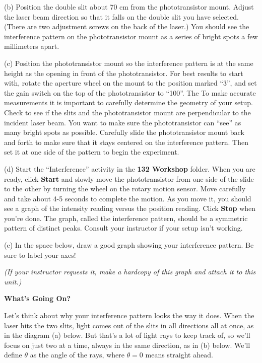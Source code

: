 (b) Position the double slit about 70 cm from the phototransistor mount. Adjust 
the laser beam direction so that it falls on the double slit you have selected. 
(There are two adjustment screws on the back of the laser.) 
You should see the interference pattern on the phototransistor mount as a series of bright spots a few millimeters apart. 

(c) Position the phototransistor mount so the interference pattern
is at the same height as the opening in front of the phototransistor. For best results to start with, rotate the aperture wheel on the mount to the position marked ``3'', and set the gain switch on the top of the phototransistor to ``100''. The To make accurate measurements it is important to carefully determine the geometry of your setup. Check to see if the slits and the phototransistor mount are perpendicular to the incident
laser beam.  You want to make sure the phototransistor can ``see'' as many
bright spots as possible. Carefully slide the phototransistor mount back and forth to make sure that it stays centered on the interference pattern. Then set it 
at one side of the pattern to begin the experiment.

(d) Start the ``Interference'' activity in the {\bf 132 Workshop} folder. 
When you are ready, click {\bf Start} and slowly move the phototransistor 
from one side of the slide to the other by turning the wheel on the rotary 
motion sensor. Move carefully and take about 4-5 seconds to complete the 
motion. 
As you move it, you should see a graph of the intensity reading versus the position reading. 
Click {\bf Stop} when you're done. 
The graph, called the interference pattern, should be a symmetric pattern of distinct peaks. Consult your instructor if your setup isn't working.

\pagebreak[2]
(e) In the space below, draw a good graph showing your interference pattern.  
Be sure to label your axes!
\answerspace{1.5in}

\textit{(If your instructor requests it, make a hardcopy of this graph and attach it to this unit.)}

\textbf{What's Going On?}

Let's think about why your interference pattern looks the way it does.  When the laser hits the two slits, 
light comes out of the slits in all directions all at once, as in the diagram (a) below.  
But that's a lot of light rays to keep track of, so we'll focus on just two at a time, always in the same direction, as in (b) below.
We'll define $\theta$ as the angle of the rays, where $\theta=0$ means straight ahead.  

